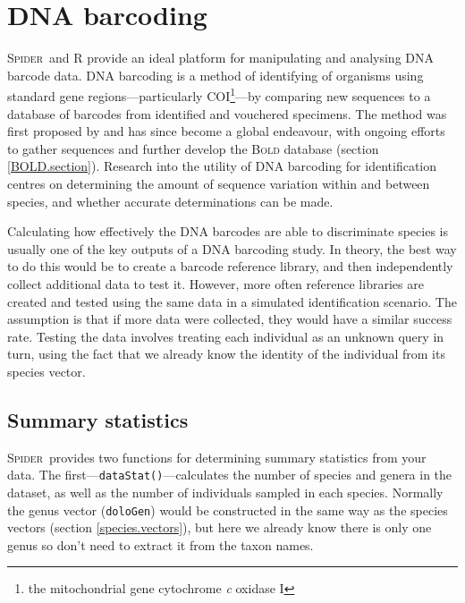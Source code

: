 \documentclass{article}
\newcommand{\Spider}{\textsc{Spider}} %
\newcommand{\progname}[1]{\textsc{#1}}
\newcommand{\fun}[1]{\texttt{#1}}
\begin{document}



\section{DNA barcoding}
\Spider~and R provide an ideal platform for manipulating and analysing DNA barcode data. DNA barcoding is a method of identifying of organisms using standard gene regions---particularly COI\footnote{the mitochondrial gene cytochrome \emph{c} oxidase I}---by comparing new sequences to a database of barcodes from identified and vouchered specimens. The method was first proposed by \citet{Her.etal.2003.barcoding} and has since become a global endeavour, with ongoing efforts to gather sequences and further develop the \progname{Bold} database (section \ref{BOLD.section}). Research into the utility of DNA barcoding for identification centres on determining the amount of sequence variation within and between species, and whether accurate determinations can be made. 

Calculating how effectively the DNA barcodes are able to discriminate species is usually one of the key outputs of a DNA barcoding study. In theory, the best way to do this would be to create a barcode reference library, and then independently collect additional data to test it. However, more often reference libraries are created and tested using the same data in a simulated identification scenario. The assumption is that if more data were collected, they would have a similar success rate. Testing the data involves treating each individual as an unknown query in turn, using the fact that we already know the identity of the individual from its species vector. 


\subsection{Summary statistics}
\Spider~provides two functions for determining summary statistics from your data. The first---\fun{dataStat()}---calculates the number of species and genera in the dataset, as well as the number of individuals sampled in each species. Normally the genus vector (\fun{doloGen}) would be constructed in the same way as the species vectors (section \ref{species.vectors}), but here we already know there is only one genus so don't need to extract it from the taxon names.
\end{document}
